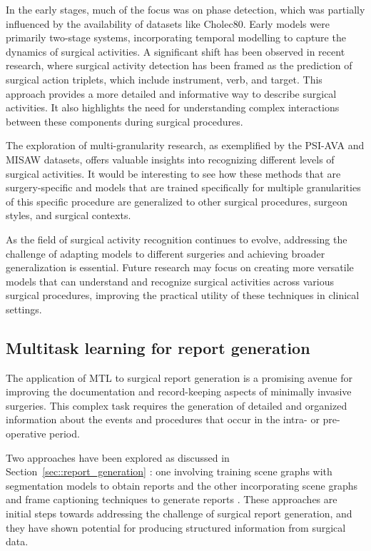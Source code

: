 \documentclass[times,twocolumn,final]{elsarticle}
\newcommand{\secref}[1]{Section~\ref{#1}}
\begin{document}
In the early stages, much of the focus was on phase detection, which was partially influenced by the availability of datasets like Cholec80. Early models were primarily two-stage systems, incorporating temporal modelling to capture the dynamics of surgical activities. A significant shift has been observed in recent research, where surgical activity detection has been framed as the prediction of surgical action triplets, which include instrument, verb, and target. This approach provides a more detailed and informative way to describe surgical activities. It also highlights the need for understanding complex interactions between these components during surgical procedures.

The exploration of multi-granularity research, as exemplified by the PSI-AVA and MISAW datasets, offers valuable insights into recognizing different levels of surgical activities. It would be interesting to see how these methods that are surgery-specific and models that are trained specifically for multiple granularities of this specific procedure are generalized to other surgical procedures, surgeon styles, and surgical contexts.  

As the field of surgical activity recognition continues to evolve, addressing the challenge of adapting models to different surgeries and achieving broader generalization is essential. Future research may focus on creating more versatile models that can understand and recognize surgical activities across various surgical procedures, improving the practical utility of these techniques in clinical settings.

\subsection{Multitask learning for report generation}
The application of MTL to surgical report generation is a promising avenue for improving the documentation and record-keeping aspects of minimally invasive surgeries. This complex task requires the generation of detailed and organized information about the events and procedures that occur in the intra- or pre-operative period.

Two approaches have been explored as discussed in \secref{sec::report_generation} : one involving training scene graphs with segmentation models to obtain reports \citep{seenivasan2022global}  and the other incorporating scene graphs and frame captioning techniques to generate reports \citep{mobarakol_task_aware}. These approaches are initial steps towards addressing the challenge of surgical report generation, and they have shown potential for producing structured information from surgical data.
\end{document}

